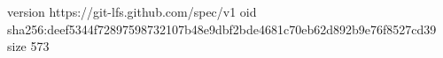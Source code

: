 version https://git-lfs.github.com/spec/v1
oid sha256:deef5344f72897598732107b48e9dbf2bde4681c70eb62d892b9e76f8527cd39
size 573
